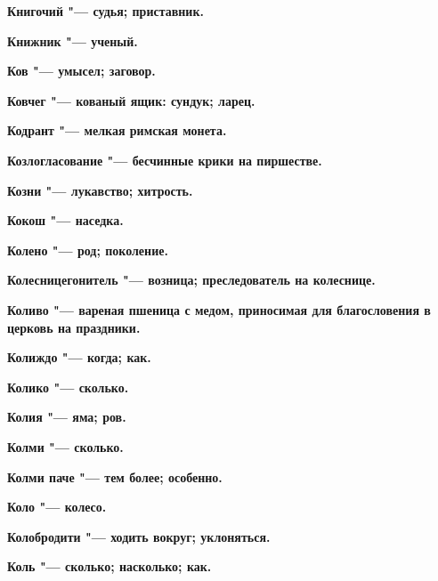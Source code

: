 \begin{mymulticols}{2}
\bfseries Книгочий\normalfont{} "--- судья; приставник. 




\bfseries Книжник\normalfont{} "--- ученый. 




\bfseries Ков\normalfont{} "--- умысел; заговор. 




\bfseries Ковчег\normalfont{} "--- кованый ящик: сундук; ларец. 




\bfseries Кодрант\normalfont{} "--- мелкая римская монета. 




\bfseries Козлогласование\normalfont{} "--- бесчинные крики на пиршестве. 




\bfseries Козни\normalfont{} "--- лукавство; хитрость. 




\bfseries Кокош\normalfont{} "--- наседка. 




\bfseries Колено\normalfont{} "--- род; поколение. 




\bfseries Колесницегонитель\normalfont{} "--- возница; преследователь на колеснице. 




\bfseries Коливо\normalfont{} "--- вареная пшеница с медом, приносимая для благословения в церковь на праздники. 




\bfseries Колиждо\normalfont{} "--- когда; как. 




\bfseries Колико\normalfont{} "--- сколько. 




\bfseries Колия\normalfont{} "--- яма; ров. 




\bfseries Колми\normalfont{} "--- сколько. 




\bfseries Колми паче\normalfont{} "--- тем более; особенно. 




\bfseries Коло\normalfont{} "--- колесо. 




\bfseries Колобродити\normalfont{} "--- ходить вокруг; уклоняться. 




\bfseries Коль\normalfont{} "--- сколько; насколько; как. 





\end{mymulticols}
